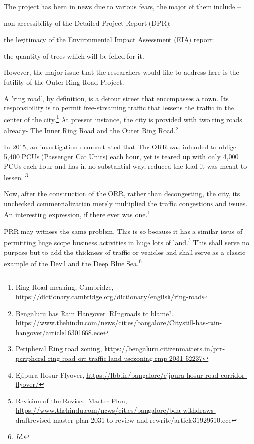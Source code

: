 \begin{multicols}{2}

\noi
The project has been in news due to various fears, the major of them include –

\noi
non-accessibility of the Detailed Project Report (DPR);

\noi
the legitimacy of the Environmental Impact Assessment (EIA) report;

\noi
the quantity of trees which will be felled for it. 

\noi
However, the major issue that the researchers would like to address here is the futility of the Outer Ring Road Project.

\noi
A 'ring road', by definition, is a detour street that encompasses a town. Its responsibility is to
permit free-streaming traffic that lessens the traffic in the center of the city.\footnote{Ring Road meaning, Cambridge, \url{https://dictionary.cambridge.org/dictionary/english/ring-road}} At present
instance, the city is provided with two ring roads already- The Inner Ring Road and the Outer
Ring Road.\footnote{Bengaluru has Rain Hangover: RIngroads to blame?, \url{https://www.thehindu.com/news/cities/bangalore/Citystill-has-rain-hangover/article16301668.ece}}

\vspace{.2cm}
\noi
In 2015, an investigation demonstrated that The ORR was intended to oblige 5,400 PCUs
(Passenger Car Units) each hour, yet is teared up with only 4,000 PCUs each hour and has in
no substantial way, reduced the load it was meant to lessen. \footnote{Peripheral Ring road zoning, \url{https://bengaluru.citizenmatters.in/prr-peripheral-ring-road-orr-traffic-land-usezoning-rmp-2031-52237}}

\noi
Now, after the construction of the ORR, rather than decongesting, the city, its unchecked
commercialization merely multiplied the traffic congestions and issues. An interesting
expression, if there ever was one.\footnote{Ejipura Hosur Flyover, \url{https://lbb.in/bangalore/ejipura-hosur-road-corridor-flyover/}}

\noi
PRR may witness the same problem. This is so because it has a similar issue of permitting
huge scope business activities in huge lots of land.\footnote{Revision of the Revised Master Plan,\\ \url{https://www.thehindu.com/news/cities/bangalore/bda-withdraws-draftrevised-master-plan-2031-to-review-and-rewrite/article31929610.ece}} This shall serve no purpose but to add the thickness of traffic or vehicles and shall serve as a classic example of the Devil and the Deep
Blue Sea.\footnote{\textit{Id.}}


\end{multicols}
